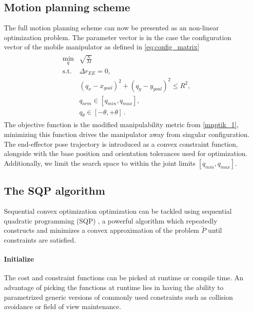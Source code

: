 \documentclass[times, utf8, diplomski, english]{fer}
\begin{document}
\subsection{Motion planning scheme}
The full motion planning scheme can now be presented as an non-linear optimization problem. 
The parameter vector is in the case the configuration vector of the mobile manipulator as defined in \eqref{eq:config_matrix}
\begin{align}
\begin{array}{rl}
\label{mnptik_2}
\min\limits_{q} &  \sqrt{\frac{\kappa}{M}}\\
\mbox{s.t.} & \Delta r_{EE} = 0, \\ 
& \left(q_{x} - x_{goal}\right)^2 + \left(q_{y} - y_{goal}\right)^2 \le R^2 , \\
& q_{arm} \in \left[q_{min}, q_{max}\right] , \\
& q_{\theta} \in \left[-\theta , +\theta \right]\, .
\end{array}
\end{align}
The objective function is the modified manipulability metric from \eqref{mnptik_1}, minimizing this function drives the manipulator away from singular configuration.
The end-effector pose trajectory is introduced as a convex constraint function, alongside with the base position and orientation tolerances used for optimization.
Additionally, we limit the search space to within the joint limits $[q_{min}, q_{max}]$.
\subsection{The SQP algorithm}
Sequential convex optimization optimization can be tackled using sequential quadratic programming (SQP) \citep{schulman2013finding, xu2010two}, a powerful algorithm which repeatedly constructs and minimizes a convex approximation of the problem $\tilde{P}$ until constraints are satisfied.
\paragraph*{Initialize}
The cost and constraint functions can be picked at runtime or compile time.
An advantage of picking the functions at runtime lies in having the ability to parametrized generic versions of commonly used constraints such as collision avoidance or field of view maintenance.
\end{document}
